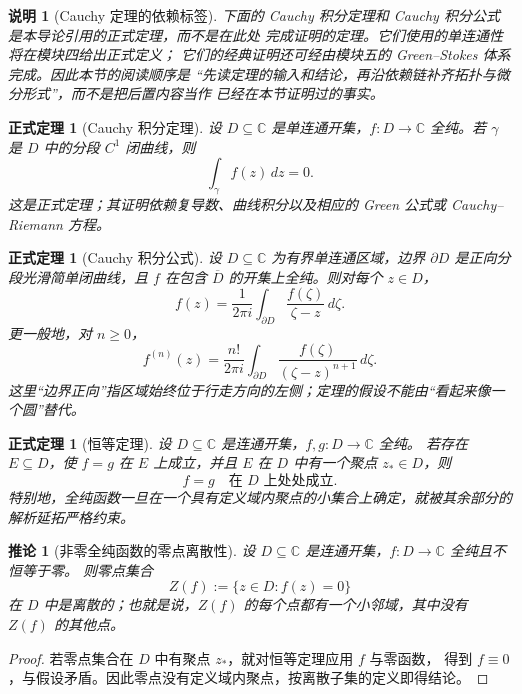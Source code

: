 \documentclass[UTF8,fontset=none,a4paper,11pt]{ctexart}
\theoremstyle{foundation-definition}
\theoremstyle{foundation-theorem}
\newtheorem{theorem}[definition]{正式定理}
\theoremstyle{foundation-proposition}
\theoremstyle{foundation-example}
\theoremstyle{foundation-remark}
\newtheorem{remark}[definition]{说明}
\theoremstyle{foundation-theorem}
\newtheorem{corollary}[definition]{推论}
\newcommand{\C}{\mathbb C}
\begin{document}
\begin{remark}[Cauchy 定理的依赖标签]
下面的 Cauchy 积分定理和 Cauchy 积分公式是本导论引用的正式定理，而不是在此处
完成证明的定理。它们使用的单连通性将在模块四给出正式定义；
它们的经典证明还可经由模块五的 Green--Stokes 体系完成。因此本节的阅读顺序是
“先读定理的输入和结论，再沿依赖链补齐拓扑与微分形式”，而不是把后置内容当作
已经在本节证明过的事实。
\end{remark}

\begin{theorem}[Cauchy 积分定理]\label{thm:cauchy-integral-theorem}
设 \(D\subseteq\C\) 是单连通开集，\(f:D\to\C\) 全纯。若 \(\gamma\) 是 \(D\) 中的分段 \(C^1\) 闭曲线，则
\[
\int_\gamma f(z)\,dz=0.
\]
这是正式定理；其证明依赖复导数、曲线积分以及相应的 Green 公式或 Cauchy--Riemann 方程。
\end{theorem}

\begin{theorem}[Cauchy 积分公式]\label{thm:cauchy-integral-formula}
设 \(D\subseteq\C\) 为有界单连通区域，边界 \(\partial D\) 是正向分段光滑简单闭曲线，且 \(f\) 在包含 \(\overline D\) 的开集上全纯。则对每个 \(z\in D\)，
\[
f(z)=\frac{1}{2\pi i}
\int_{\partial D}\frac{f(\zeta)}{\zeta-z}\,d\zeta.
\]
更一般地，对 \(n\geq0\)，
\[
f^{(n)}(z)=\frac{n!}{2\pi i}
\int_{\partial D}
\frac{f(\zeta)}{(\zeta-z)^{n+1}}\,d\zeta.
\]
这里“边界正向”指区域始终位于行走方向的左侧；定理的假设不能由“看起来像一个圆”替代。
\end{theorem}

\begin{theorem}[恒等定理]
设 \(D\subseteq\mathbb C\) 是连通开集，\(f,g:D\to\mathbb C\) 全纯。
若存在 \(E\subseteq D\)，使 \(f=g\) 在 \(E\) 上成立，并且 \(E\)
在 \(D\) 中有一个聚点 \(z_\ast\in D\)，则
\[
f=g\quad\text{在 }D\text{ 上处处成立}.
\]
特别地，全纯函数一旦在一个具有定义域内聚点的小集合上确定，就被其余部分的解析延拓严格约束。
\end{theorem}

\begin{corollary}[非零全纯函数的零点离散性]\label{cor:holomorphic-zero-discrete}
设 \(D\subseteq\mathbb C\) 是连通开集，\(f:D\to\mathbb C\) 全纯且不恒等于零。
则零点集合
\[
Z(f):=\{z\in D:f(z)=0\}
\]
在 \(D\) 中是离散的；也就是说，\(Z(f)\) 的每个点都有一个小邻域，其中没有
\(Z(f)\) 的其他点。
\end{corollary}

\begin{proof}
若零点集合在 \(D\) 中有聚点 \(z_\ast\)，就对恒等定理应用 \(f\) 与零函数，
得到 \(f\equiv0\)，与假设矛盾。因此零点没有定义域内聚点，按离散子集的定义即得结论。
\end{proof}
\end{document}
